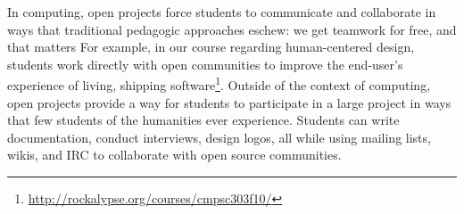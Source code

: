 \documentclass{sig-alternate}
\begin{document}
In computing, open projects force students to communicate and collaborate in ways that traditional pedagogic approaches eschew: we get teamwork for free, and that matters%
For example, in our course regarding human-centered design, students work directly with open communities to improve the end-user's experience of living, shipping software\footnote{\url{http://rockalypse.org/courses/cmpsc303f10/}}. %
Outside of the context of computing, open projects provide a way for students to participate in a large project in ways that few students of the humanities ever experience. %
Students can write documentation, conduct interviews, design logos, all while using mailing lists, wikis, and IRC to collaborate with %
open source communities. %


\begin{comment}       
	
	\and
	\alignauthor  Matthew C. Jadud\\  
	       \affaddr{Allegheny College}\\
	       \affaddr{520 N. Main St.}\\
	       \affaddr{Meadville, PA 16335}\\
	       \email{matthew.c@jadud.com}    
	\alignauthor  Gregory W. Hislop (Moderator)\\
	       \affaddr{Drexel University}\\
				 \affaddr{3141 Chestnut St.}
	       \affaddr{Philadelphia, PA 19104}\\
	       \email{hislop@drexel.edu}	                 
	
	
* [1] [[BegelBibTexChooseOne|Begel BibTeX]]
* [2] http://rockalypse.org/blogs/flyinggator/
* [3] http://concurrency.cc/book/
* [4] http://rockalypse.org/courses/cmpsc303f10/
* [5] http://fedoraproject.org/wiki/Allegheny_Activism_And_Fedora
* [6] http://rockalypse.org/courses/fs101f10/
* [7] [[LPPBibTeX|Lave & Wenger BibTeX]]
\end{comment}
\end{document}
